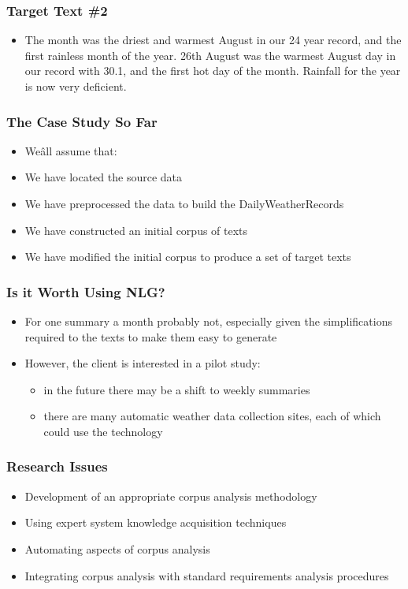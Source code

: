 \documentclass[compress,color=usenames]{beamer}
\begin{document}
\begin{frame}
\frametitle{Target Text \#2}

\label{f108}
\begin{itemize}
\item { {The month was the driest and warmest August in our 24 year record, and the first rainless month of the year. 26th August was the warmest August day in our record with 30.1, and the first hot day of the month. Rainfall for the year is now very deficient.}}
\end{itemize}

 \end{frame}

\begin{frame}
\frametitle{The Case Study So Far}

\label{f110}
\begin{itemize}
\item { {We\^all assume that:}}
\item { {We have located the source data}}
\item { {We have preprocessed the data to build the DailyWeatherRecords}}
\item { {We have constructed an initial corpus of texts}}
\item { {We have modified the initial corpus to produce a set of target texts}}
\end{itemize}

 \end{frame}


\begin{frame}
\frametitle{Is it Worth Using NLG?}

\label{f112}
\begin{itemize}
\item { {For one summary a month probably not, especially given the simplifications required to the texts to make them easy to generate}}
\item { {However, the client is interested in a pilot study: }}
\begin{itemize}
\item in the future there may be a shift to weekly summaries
\item there are many automatic weather data collection sites, each of which could use the technology
\end{itemize}
\end{itemize}

 \end{frame}

\begin{frame}
\frametitle{Research Issues}

\label{f114}
\begin{itemize}
\item { {Development of an appropriate corpus analysis methodology}}
\item { {Using expert system knowledge acquisition techniques}}
\item { {Automating aspects of corpus analysis}}
\item { {Integrating corpus analysis with standard requirements analysis procedures}}
\end{itemize}

 \end{frame}
\end{document}
